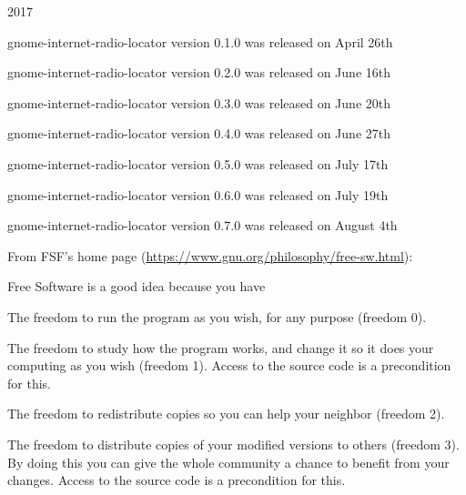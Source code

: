 \documentclass[20pt,landscape]{foils}
\begin{document}
\begin{list1}
\item 2017
  \begin{list2}  
  \item gnome-internet-radio-locator version 0.1.0 was released on April 26th
  \end{list2}
  \begin{list2}
  \item gnome-internet-radio-locator version 0.2.0 was released on June 16th
  \end{list2}    
  \begin{list2}
  \item gnome-internet-radio-locator version 0.3.0 was released on June 20th
  \end{list2}
  \begin{list2}
  \item gnome-internet-radio-locator version 0.4.0 was released on June 27th
  \end{list2}
  \begin{list2}
  \item gnome-internet-radio-locator version 0.5.0 was released on July 17th
  \end{list2}
  \begin{list2}
  \item gnome-internet-radio-locator version 0.6.0 was released on July 19th
  \end{list2}
  \begin{list2}
  \item gnome-internet-radio-locator version 0.7.0 was released on August 4th
  \end{list2}
\end{list1}


From FSF's home page (\url{https://www.gnu.org/philosophy/free-sw.html}):

\begin{list1}
\item Free Software is a good idea because you have
  \begin{list2}
    \item The freedom to run the program as you wish, for any purpose (freedom 0).
    \item The freedom to study how the program works, and change it so it does your computing as you wish (freedom 1). Access to the source code is a precondition for this.
    \item The freedom to redistribute copies so you can help your neighbor (freedom 2).
    \item The freedom to distribute copies of your modified versions to others (freedom 3). By doing this you can give the whole community a chance to benefit from your changes. Access to the source code is a precondition for this.
  \end{list2}
\end{list1}
\end{document}
